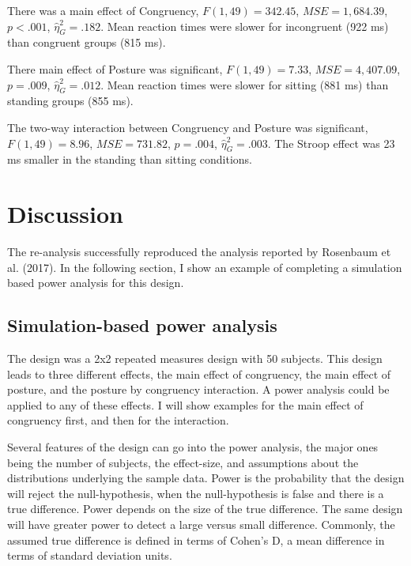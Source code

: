 \documentclass[man]{apa6}
\begin{document}
There was a main effect of Congruency, \(F(1, 49) = 342.45\), \(\mathit{MSE} = 1,684.39\), \(p < .001\), \(\hat{\eta}^2_G = .182\). Mean reaction times were slower for incongruent (922 ms) than congruent groups (815 ms).

There main effect of Posture was significant, \(F(1, 49) = 7.33\), \(\mathit{MSE} = 4,407.09\), \(p = .009\), \(\hat{\eta}^2_G = .012\). Mean reaction times were slower for sitting (881 ms) than standing groups (855 ms).

The two-way interaction between Congruency and Posture was significant, \(F(1, 49) = 8.96\), \(\mathit{MSE} = 731.82\), \(p = .004\), \(\hat{\eta}^2_G = .003\). The Stroop effect was 23 ms smaller in the standing than sitting conditions.

\hypertarget{discussion}{%
\section{Discussion}\label{discussion}}

The re-analysis successfully reproduced the analysis reported by Rosenbaum et al. (2017). In the following section, I show an example of completing a simulation based power analysis for this design.

\hypertarget{simulation-based-power-analysis}{%
\subsection{Simulation-based power analysis}\label{simulation-based-power-analysis}}

The design was a 2x2 repeated measures design with 50 subjects. This design leads to three different effects, the main effect of congruency, the main effect of posture, and the posture by congruency interaction. A power analysis could be applied to any of these effects. I will show examples for the main effect of congruency first, and then for the interaction.

Several features of the design can go into the power analysis, the major ones being the number of subjects, the effect-size, and assumptions about the distributions underlying the sample data. Power is the probability that the design will reject the null-hypothesis, when the null-hypothesis is false and there is a true difference. Power depends on the size of the true difference. The same design will have greater power to detect a large versus small difference. Commonly, the assumed true difference is defined in terms of Cohen's D, a mean difference in terms of standard deviation units.
\end{document}
